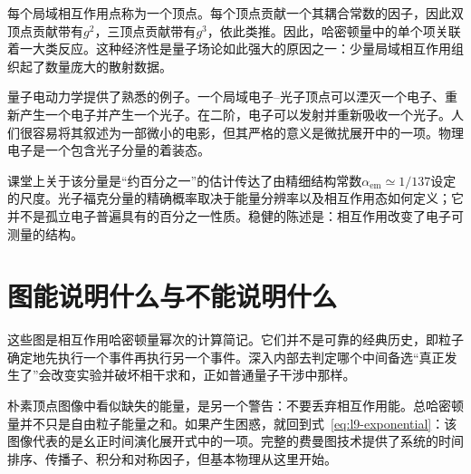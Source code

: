 每个局域相互作用点称为一个顶点。每个顶点贡献一个其耦合常数的因子，因此双顶点贡献带有\(g^2\)，三顶点贡献带有\(g^3\)，依此类推。因此，哈密顿量中的单个项关联着一大类反应。这种经济性是量子场论如此强大的原因之一：少量局域相互作用组织起了数量庞大的散射数据。

\begin{classroomqa}
\end{classroomqa}

量子电动力学提供了熟悉的例子。一个局域电子--光子顶点可以湮灭一个电子、重新产生一个电子并产生一个光子。在二阶，电子可以发射并重新吸收一个光子。人们很容易将其叙述为一部微小的电影，但其严格的意义是微扰展开中的一项。物理电子是一个包含光子分量的着装态。

课堂上关于该分量是``约百分之一''的估计传达了由精细结构常数\(\alpha_{\mathrm{em}}\simeq 1/137\)设定的尺度。光子福克分量的精确概率取决于能量分辨率以及相互作用态如何定义；它并不是孤立电子普遍具有的百分之一性质。稳健的陈述是：相互作用改变了电子可测量的结构。

\section{图能说明什么与不能说明什么}

这些图是相互作用哈密顿量幂次的计算简记。它们并不是可靠的经典历史，即粒子确定地先执行一个事件再执行另一个事件。深入内部去判定哪个中间备选``真正发生了''会改变实验并破坏相干求和，正如普通量子干涉中那样。

\begin{classroomqa}
\end{classroomqa}

朴素顶点图像中看似缺失的能量，是另一个警告：不要丢弃相互作用能。总哈密顿量并不只是自由粒子能量之和。如果产生困惑，就回到式~\eqref{eq:l9-exponential}：该图像代表的是幺正时间演化展开式中的一项。完整的费曼图技术提供了系统的时间排序、传播子、积分和对称因子，但基本物理从这里开始。

